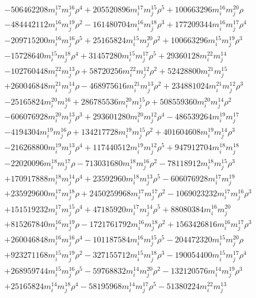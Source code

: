 {\begin{align*}
&-506462208m_i^{17}m_j^{16}\rho^{4}+205520896m_i^{17}m_j^{15}\rho^{5}+100663296m_i^{16}m_j^{20}\rho\\
&-484442112m_i^{16}m_j^{19}\rho^{2}-161480704m_i^{16}m_j^{18}\rho^{3}+177209344m_i^{16}m_j^{17}\rho^{4}\\
&-209715200m_i^{16}m_j^{16}\rho^{5}+25165824m_i^{15}m_j^{20}\rho^{2}+100663296m_i^{15}m_j^{19}\rho^{3}\\
&-15728640m_i^{15}m_j^{18}\rho^{4}+31457280m_i^{15}m_j^{17}\rho^{5}+29360128m_i^{22}m_j^{14}\\
&-102760448m_i^{22}m_j^{13}\rho+58720256m_i^{22}m_j^{12}\rho^{2}+52428800m_i^{21}m_j^{15}\\
&+260046848m_i^{21}m_j^{14}\rho-468975616m_i^{21}m_j^{13}\rho^{2}+234881024m_i^{21}m_j^{12}\rho^{3}\\
&-25165824m_i^{20}m_j^{16}+286785536m_i^{20}m_j^{15}\rho+508559360m_i^{20}m_j^{14}\rho^{2}\\
&-606076928m_i^{20}m_j^{13}\rho^{3}+293601280m_i^{20}m_j^{12}\rho^{4}-486539264m_i^{19}m_j^{17}\\
&-4194304m_i^{19}m_j^{16}\rho+134217728m_i^{19}m_j^{15}\rho^{2}+401604608m_i^{19}m_j^{14}\rho^{3}\\
&-216268800m_i^{19}m_j^{13}\rho^{4}+117440512m_i^{19}m_j^{12}\rho^{5}+947912704m_i^{18}m_j^{18}\\
&-22020096m_i^{18}m_j^{17}\rho-713031680m_i^{18}m_j^{16}\rho^{2}-78118912m_i^{18}m_j^{15}\rho^{3}\\
&+170917888m_i^{18}m_j^{14}\rho^{4}+23592960m_i^{18}m_j^{13}\rho^{5}-606076928m_i^{17}m_j^{19}\\
&+235929600m_i^{17}m_j^{18}\rho+2450259968m_i^{17}m_j^{17}\rho^{2}-1069023232m_i^{17}m_j^{16}\rho^{3}\\
&+151519232m_i^{17}m_j^{15}\rho^{4}+47185920m_i^{17}m_j^{14}\rho^{5}+88080384m_i^{16}m_j^{20}\\
&+815267840m_i^{16}m_j^{19}\rho-1721761792m_i^{16}m_j^{18}\rho^{2}+1563426816m_i^{16}m_j^{17}\rho^{3}\\
&+260046848m_i^{16}m_j^{16}\rho^{4}-101187584m_i^{16}m_j^{15}\rho^{5}-204472320m_i^{15}m_j^{20}\rho\\
&+923271168m_i^{15}m_j^{19}\rho^{2}-327155712m_i^{15}m_j^{18}\rho^{3}-190054400m_i^{15}m_j^{17}\rho^{4}\\
&+268959744m_i^{15}m_j^{16}\rho^{5}-59768832m_i^{14}m_j^{20}\rho^{2}-132120576m_i^{14}m_j^{19}\rho^{3}\\
&+25165824m_i^{14}m_j^{18}\rho^{4}-58195968m_i^{14}m_j^{17}\rho^{5}-51380224m_i^{22}m_j^{13}\\

\end{align*}}
